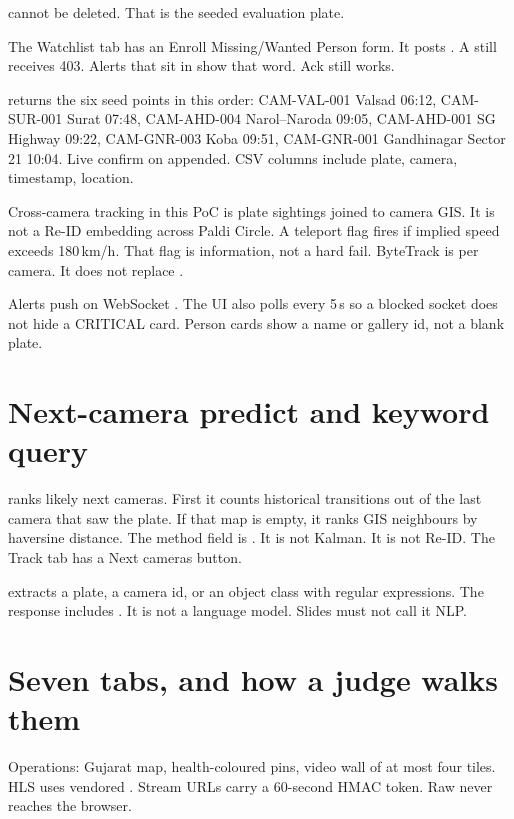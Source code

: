 \documentclass[listings]{csf301-notes}
\begin{document}
 cannot be deleted. That is the seeded evaluation plate.

The Watchlist tab has an Enroll Missing/Wanted Person form. It posts . A  still receives 403. Alerts that sit in  show that word. Ack still works.

\begin{example}
 returns the six seed points in this order: CAM-VAL-001 Valsad 06:12, CAM-SUR-001 Surat 07:48, CAM-AHD-004 Narol--Naroda 09:05, CAM-AHD-001 SG Highway 09:22, CAM-GNR-003 Koba 09:51, CAM-GNR-001 Gandhinagar Sector 21 10:04. Live confirm on  appended. CSV columns include plate, camera, timestamp, location.
\end{example}

Cross-camera tracking in this PoC is plate sightings joined to camera GIS. It is not a Re-ID embedding across Paldi Circle. A teleport flag fires if implied speed exceeds 180\,km/h. That flag is information, not a hard fail. ByteTrack  is per camera. It does not replace .

Alerts push on WebSocket . The UI also polls every 5\,s so a blocked socket does not hide a CRITICAL card. Person cards show a name or gallery id, not a blank plate.

\section{Next-camera predict and keyword query}
 ranks likely next cameras. First it counts historical transitions out of the last camera that saw the plate. If that map is empty, it ranks GIS neighbours by haversine distance. The method field is . It is not Kalman. It is not Re-ID. The Track tab has a Next cameras button.

 extracts a plate, a camera id, or an object class with regular expressions. The response includes . It is not a language model. Slides must not call it NLP.

\section{Seven tabs, and how a judge walks them}
Operations: Gujarat map, health-coloured pins, video wall of at most four tiles. HLS uses vendored . Stream URLs carry a 60-second HMAC token. Raw  never reaches the browser.
\end{document}
